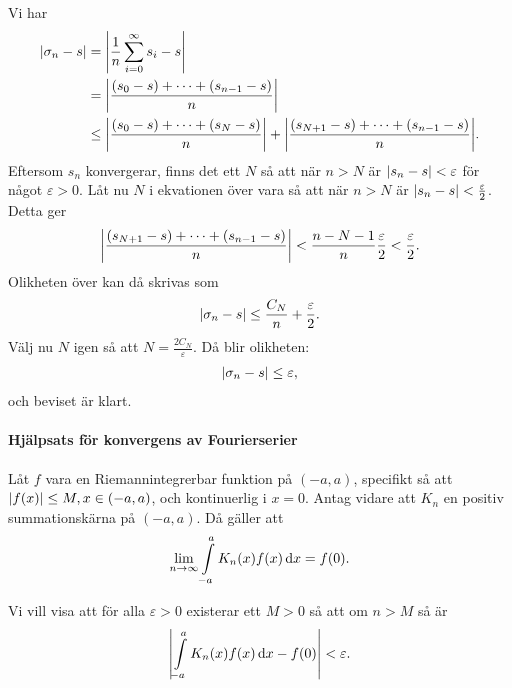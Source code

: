 \proof
Vi har
\begin{align*}
	\abs{\sigma_{n} - s} &= \abs{\frac{1}{n}\sum\limits_{i = 0}^{\infty}s_{i} - s} \\
	                     &= \abs{\frac{(s_{0} - s) + \dots + (s_{n - 1} - s)}{n}} \\
	                     &\leq  \abs{\frac{(s_{0} - s) + \dots + (s_{N} - s)}{n}} + \abs{\frac{(s_{N + 1} - s) + \dots + (s_{n - 1} - s)}{n}}.
\end{align*}
Eftersom $s_{n}$ konvergerar, finns det ett $N$ så att när $n > N$ är $\abs{s_{n} - s} < \varepsilon$ för något $\varepsilon > 0$. Låt nu $N$ i ekvationen över vara så att när $n > N$ är $\abs{s_{n} - s} < \frac{\varepsilon}{2}$. Detta ger
\begin{align*}
	\abs{\frac{(s_{N + 1} - s) + \dots + (s_{n - 1} - s)}{n}} < \frac{n - N - 1}{n}\frac{\varepsilon}{2} < \frac{\varepsilon}{2}.
\end{align*}
Olikheten över kan då skrivas som
\begin{align*}
	\abs{\sigma_{n} - s} \leq \frac{C_{N}}{n} + \frac{\varepsilon}{2}.
\end{align*}
Välj nu $N$ igen så att $N = \frac{2C_{N}}{\varepsilon}$. Då blir olikheten:
\begin{align*}
	\abs{\sigma_{n} - s} \leq \varepsilon,
\end{align*}
och beviset är klart.

\paragraph{Hjälpsats för konvergens av Fourierserier}
Låt $f$ vara en Riemannintegrerbar funktion på $(-a, a)$, specifikt så att $\abs{f(x)}\leq M, x\in (-a, a)$, och kontinuerlig i $x = 0$. Antag vidare att $K_{n}$ en positiv summationskärna på $(-a, a)$. Då gäller att
\begin{align*}
	\lim\limits_{n\to\infty}\int\limits_{-a}^{a}K_{n}(x)f(x)\dd{x} = f(0).
\end{align*}

\proof
Vi vill visa att för alla $\varepsilon > 0$ existerar ett $M > 0$ så att om $n > M$ så är
\begin{align*}
	\abs{\int\limits_{-a}^{a}K_{n}(x)f(x)\dd{x} - f(0)} < \varepsilon.
\end{align*}

